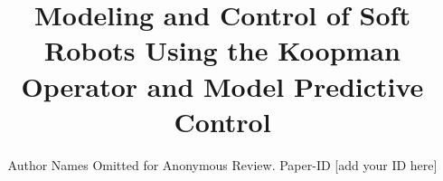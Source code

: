 \documentclass[conference]{IEEEtran}
\begin{document}
\title{Modeling and Control of Soft Robots Using the Koopman Operator and Model Predictive Control}

\author{Author Names Omitted for Anonymous Review. Paper-ID [add your ID here]}





% 


\maketitle
\end{document}
